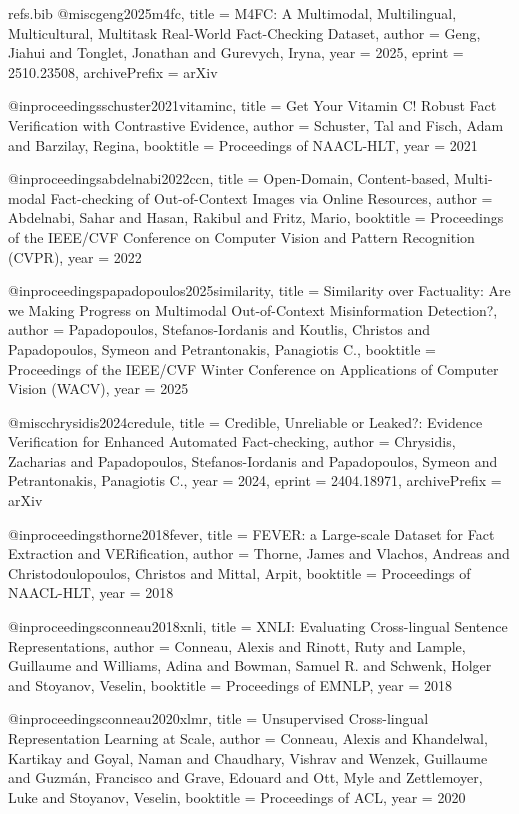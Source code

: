 \begin{filecontents*}[overwrite]{refs.bib}
@misc{geng2025m4fc,
  title         = {{M4FC}: A Multimodal, Multilingual, Multicultural, Multitask Real-World Fact-Checking Dataset},
  author        = {Geng, Jiahui and Tonglet, Jonathan and Gurevych, Iryna},
  year          = {2025},
  eprint        = {2510.23508},
  archivePrefix = {arXiv}
}

@inproceedings{schuster2021vitaminc,
  title     = {Get Your Vitamin {C}! Robust Fact Verification with Contrastive Evidence},
  author    = {Schuster, Tal and Fisch, Adam and Barzilay, Regina},
  booktitle = {Proceedings of NAACL-HLT},
  year      = {2021}
}

@inproceedings{abdelnabi2022ccn,
  title     = {Open-Domain, Content-based, Multi-modal Fact-checking of Out-of-Context Images via Online Resources},
  author    = {Abdelnabi, Sahar and Hasan, Rakibul and Fritz, Mario},
  booktitle = {Proceedings of the IEEE/CVF Conference on Computer Vision and Pattern Recognition (CVPR)},
  year      = {2022}
}

@inproceedings{papadopoulos2025similarity,
  title     = {Similarity over Factuality: Are we Making Progress on Multimodal Out-of-Context Misinformation Detection?},
  author    = {Papadopoulos, Stefanos-Iordanis and Koutlis, Christos and Papadopoulos, Symeon and Petrantonakis, Panagiotis C.},
  booktitle = {Proceedings of the IEEE/CVF Winter Conference on Applications of Computer Vision (WACV)},
  year      = {2025}
}

@misc{chrysidis2024credule,
  title         = {Credible, Unreliable or Leaked?: Evidence Verification for Enhanced Automated Fact-checking},
  author        = {Chrysidis, Zacharias and Papadopoulos, Stefanos-Iordanis and Papadopoulos, Symeon and Petrantonakis, Panagiotis C.},
  year          = {2024},
  eprint        = {2404.18971},
  archivePrefix = {arXiv}
}

@inproceedings{thorne2018fever,
  title     = {{FEVER}: a Large-scale Dataset for Fact Extraction and {VERification}},
  author    = {Thorne, James and Vlachos, Andreas and Christodoulopoulos, Christos and Mittal, Arpit},
  booktitle = {Proceedings of NAACL-HLT},
  year      = {2018}
}

@inproceedings{conneau2018xnli,
  title     = {{XNLI}: Evaluating Cross-lingual Sentence Representations},
  author    = {Conneau, Alexis and Rinott, Ruty and Lample, Guillaume and Williams, Adina and Bowman, Samuel R. and Schwenk, Holger and Stoyanov, Veselin},
  booktitle = {Proceedings of EMNLP},
  year      = {2018}
}

@inproceedings{conneau2020xlmr,
  title     = {Unsupervised Cross-lingual Representation Learning at Scale},
  author    = {Conneau, Alexis and Khandelwal, Kartikay and Goyal, Naman and Chaudhary, Vishrav and Wenzek, Guillaume and Guzm{\'a}n, Francisco and Grave, Edouard and Ott, Myle and Zettlemoyer, Luke and Stoyanov, Veselin},
  booktitle = {Proceedings of ACL},
  year      = {2020}
}


\end{filecontents*}
